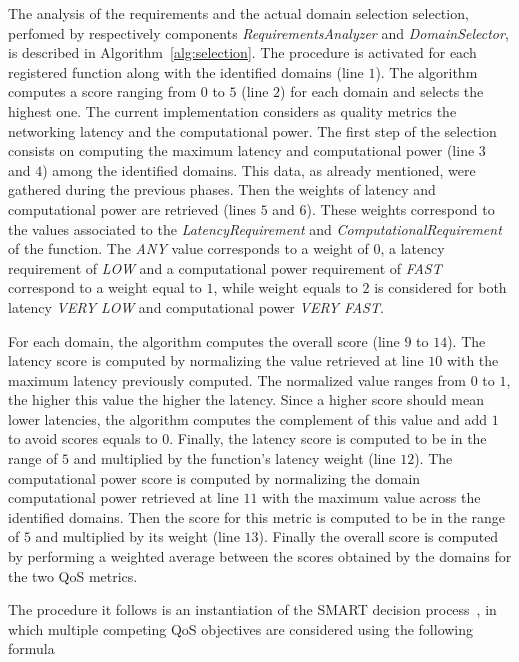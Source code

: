 The analysis of the requirements and the actual domain selection selection, perfomed by respectively components  \textit{RequirementsAnalyzer} and \textit{DomainSelector}, is described in Algorithm~\ref{alg:selection}. The procedure is activated for each registered function along with the identified domains (line $1$). The algorithm computes a score ranging from $0$ to $5$ (line $2$) for each domain and selects the highest one. The current implementation considers as quality metrics the networking latency and the computational power. The first step of the selection consists on computing the maximum latency and computational power (line $3$ and $4$) among the identified domains. This data, as already mentioned, were gathered during the previous phases. Then the weights of latency and computational power are retrieved (lines $5$ and $6$). These weights correspond to the values associated to the \textit{LatencyRequirement} and \textit{ComputationalRequirement} of the function. The \textit{ANY} value corresponds to a weight of $0$, a latency requirement of \textit{LOW} and a computational power requirement of \textit{FAST} correspond to a weight equal to $1$, while weight equals to $2$ is considered for both latency \textit{VERY LOW} and computational power \textit{VERY FAST}.

For each domain, the algorithm computes the overall score (line  $9$ to $14$). The latency score is computed by normalizing the value retrieved at line $10$ with the maximum latency previously computed. The normalized value ranges from $0$ to $1$, the higher this value the higher the latency. Since a higher score should mean lower latencies, the algorithm computes the complement of this value and add $1$ to avoid scores equals to $0$. Finally, the latency score is computed to be in the range of $5$ and multiplied by the function's latency weight (line $12$). The computational power score is computed by normalizing the domain computational power retrieved at line $11$ with the  maximum value across the identified domains. Then the score for this metric is computed to be in the range of $5$ and multiplied by its weight (line $13$). Finally the overall score is computed by performing a weighted average between the scores obtained by the domains for the two QoS metrics.

The procedure it follows is an instantiation of the SMART decision process~\cite{Olson1996}, in which multiple competing QoS objectives are considered using the following formula


